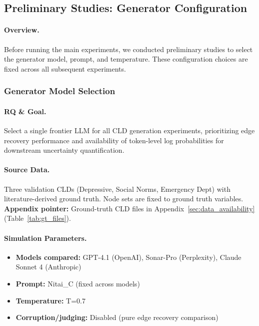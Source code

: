 \subsection{Preliminary Studies: Generator Configuration}
\label{sec:preliminary_studies}

\paragraph{Overview.}
Before running the main experiments, we conducted preliminary studies to select the generator model, prompt, and temperature. These configuration choices are fixed across all subsequent experiments.

\subsubsection{Generator Model Selection}

\paragraph{RQ \& Goal.}
Select a single frontier LLM for all CLD generation experiments, prioritizing edge recovery performance and availability of token-level log probabilities for downstream uncertainty quantification.

\paragraph{Source Data.}
Three validation CLDs (Depressive, Social Norms, Emergency Dept) with literature-derived ground truth. Node sets are fixed to ground truth variables.
\textbf{Appendix pointer:} Ground-truth CLD files in Appendix~\ref{sec:data_availability} (Table~\ref{tab:gt_files}).

\paragraph{Simulation Parameters.}
\begin{itemize}[noitemsep]
    \item \textbf{Models compared:} GPT-4.1 (OpenAI), Sonar-Pro (Perplexity), Claude Sonnet 4 (Anthropic)
    \item \textbf{Prompt:} Nitai\_C (fixed across models)
    \item \textbf{Temperature:} T=0.7
    \item \textbf{Corruption/judging:} Disabled (pure edge recovery comparison)
\end{itemize}


